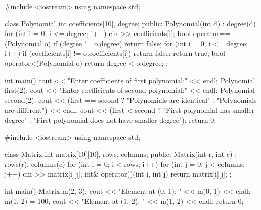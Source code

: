 \outputlabel
{}


\codelabel

\begin{code}
#include <iostream>
using namespace std;

class Polynomial {
    int coefficients[10], degree;
public:
    Polynomial(int d) : degree(d) {
        for (int i = 0; i <= degree; i++) cin >> coefficients[i];
    }
    bool operator==(Polynomial o) {
        if (degree != o.degree) return false;
        for (int i = 0; i <= degree; i++)
            if (coefficients[i] != o.coefficients[i]) return false;
        return true;
    }
    bool operator<(Polynomial o) { return degree < o.degree; }
};

int main() {
    cout << "Enter coefficients of first polynomial:" << endl;
    Polynomial first(2);
    cout << "Enter coefficients of second polynomial:" << endl;
    Polynomial second(2);
    cout << (first == second ? "Polynomials are identical" : "Polynomials are different") << endl;
    cout << (first < second ? "First polynomial has smaller degree" : "First polynomial does not have smaller degree");
    return 0;
}
\end{code}

\outputlabel
{}


\codelabel

\begin{code}
#include <iostream>
using namespace std;

class Matrix {
    int matrix[10][10], rows, columns;
public:
    Matrix(int r, int c) : rows(r), columns(c) {
        for (int i = 0; i < rows; i++)
            for (int j = 0; j < columns; j++) cin >> matrix[i][j];
    }
    int& operator()(int i, int j) { return matrix[i][j]; }
};

int main() {
    Matrix m(2, 3);
    cout << "Element at (0, 1): " << m(0, 1) << endl;
    m(1, 2) = 100;
    cout << "Element at (1, 2): " << m(1, 2) << endl;
    return 0;
}
\end{code}


